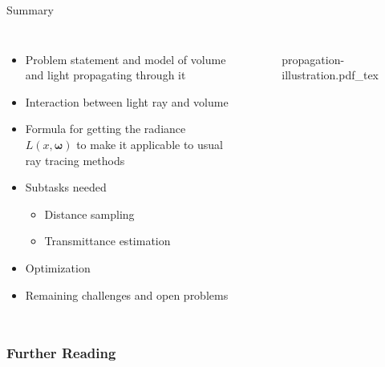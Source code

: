 \documentclass[
  english,            %
  aspectratio=169,    %
]{tumbeamer}
\newcommand\bomega[0]{\bm{\omega}}
\begin{document}
\begin{frame}{Summary}
\begin{columns}[t, onlytextwidth]
    \begin{itemize}
        \item Problem statement and model of volume and light propagating
            through it
        \item Interaction between light ray and volume
        \item Formula for getting the radiance $L(x, \bomega)$ to make it
            applicable to usual ray tracing methods
        \item Subtasks needed
            \begin{itemize}
                \item Distance sampling
                \item Transmittance estimation
            \end{itemize}
        \item Optimization
        \item Remaining challenges and open problems
    \end{itemize}
    \begin{figure}[ht]
      \centering
      \def\svgwidth{\columnwidth}
      {propagation-illustration.pdf_tex}
    \end{figure}
\end{columns}
\end{frame}

\maketitle

\begin{frame}[allowframebreaks]
  \frametitle{Further Reading}
  
\end{frame}
\end{document}
